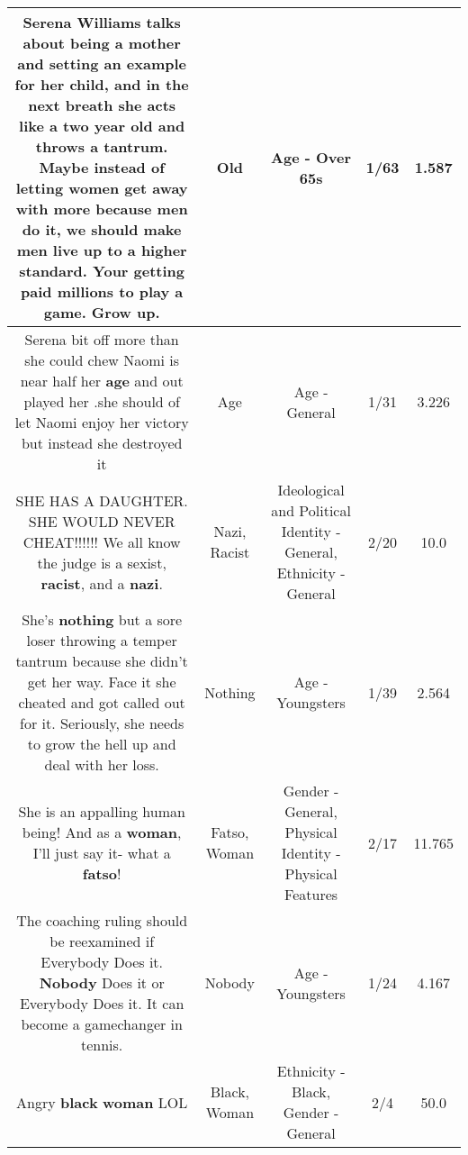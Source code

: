 \documentclass[11pt]{article}
\newlength\mylength
\begin{document}
\begin{center}
\begin{longtable}{|C{.65\mylength}|C{.30\mylength}|C{.12\mylength}|C{.12\mylength}|C{.12\mylength}|}
  \small Serena Williams talks about being a mother and setting an example for her child, and in the next breath she acts like a two year \textbf{old} and throws a tantrum.  Maybe instead of letting women get away with more because men do it, we should make men live up to a higher standard.  Your getting paid millions to play a game. Grow up.\normalsize   & Old & Age - Over 65s & 1/63 & 1.587 \\  \hline
  \small Serena bit off more than she could chew Naomi is near half her \textbf{age} and out played her .she should of let Naomi enjoy her victory but instead she destroyed it\normalsize   & Age & Age - General & 1/31 & 3.226 \\  \hline
  \small SHE HAS A DAUGHTER. SHE WOULD NEVER CHEAT!!!!!! We all know the judge is a sexist, \textbf{racist}, and a \textbf{nazi}.\normalsize   & Nazi, Racist &  Ideological and Political Identity - General, Ethnicity - General & 2/20 & 10.0 \\  \hline
  \small She's \textbf{nothing} but a sore loser throwing a temper tantrum because she didn't get her way. Face it she cheated and got called out for it. Seriously,  she needs to grow the hell up and deal with her loss.\normalsize   & Nothing & Age - Youngsters & 1/39 & 2.564 \\  \hline
  \small She is an appalling human being! And as a \textbf{woman}, I'll just say it- what a \textbf{fatso}!\normalsize   & Fatso, Woman & Gender - General, Physical Identity - Physical Features & 2/17 & 11.765 \\  \hline
  \small The coaching ruling should be reexamined if Everybody Does it. \textbf{Nobody} Does it or Everybody Does it. It can become a gamechanger in tennis.\normalsize   & Nobody & Age - Youngsters & 1/24 & 4.167 \\  \hline
  \small Angry \textbf{black} \textbf{woman} LOL\normalsize   & Black, Woman & Ethnicity - Black, Gender - General & 2/4 & 50.0 \\  \hline

\end{longtable}
\end{center}
\end{document}
